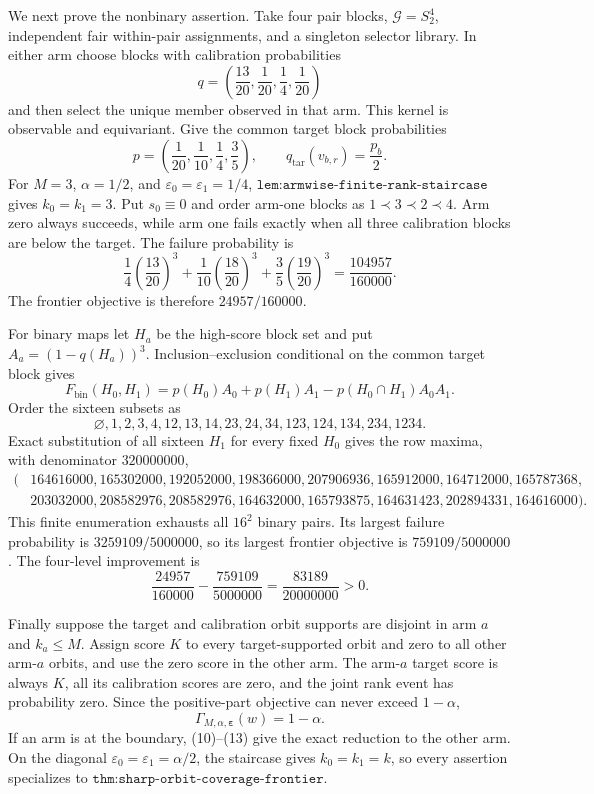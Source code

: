 We next prove the nonbinary assertion.  Take four pair blocks, \(\mathcal G=S_2^4\), independent fair within-pair assignments, and a singleton selector library.  In either arm choose blocks with calibration probabilities
\[
q=\left(\frac{13}{20},\frac1{20},\frac14,\frac1{20}\right)
\]
and then select the unique member observed in that arm.  This kernel is observable and equivariant.  Give the common target block probabilities
\[
p=\left(\frac1{20},\frac1{10},\frac14,\frac35\right),\qquad
q_{\mathrm{tar}}(v_{b,r})=\frac{p_b}{2}. \tag{15}
\]
For \(M=3\), \(\alpha=1/2\), and \(\varepsilon_0=\varepsilon_1=1/4\), \(\texttt{lem:armwise-finite-rank-staircase}\) gives \(k_0=k_1=3\).  Put \(s_0\equiv0\) and order arm-one blocks as \(1\prec3\prec2\prec4\).  Arm zero always succeeds, while arm one fails exactly when all three calibration blocks are below the target.  The failure probability is
\[
\frac14\left(\frac{13}{20}\right)^3+
\frac1{10}\left(\frac{18}{20}\right)^3+
\frac35\left(\frac{19}{20}\right)^3
=\frac{104957}{160000}. \tag{16}
\]
The frontier objective is therefore \(24957/160000\).

For binary maps let \(H_a\) be the high-score block set and put \(A_a=(1-q(H_a))^3\).  Inclusion--exclusion conditional on the common target block gives
\[
F_{\mathrm{bin}}(H_0,H_1)
=p(H_0)A_0+p(H_1)A_1-p(H_0\cap H_1)A_0A_1. \tag{17}
\]
Order the sixteen subsets as
\[
\varnothing,1,2,3,4,12,13,14,23,24,34,123,124,134,234,1234.
\]
Exact substitution of all sixteen \(H_1\) for every fixed \(H_0\) gives the row maxima, with denominator \(320000000\),
\[
\begin{split}
(&164616000,165302000,192052000,198366000,207906936,165912000,164712000,165787368,\\
&203032000,208582976,208582976,164632000,165793875,164631423,202894331,164616000).
\end{split} \tag{18}
\]
This finite enumeration exhausts all \(16^2\) binary pairs.  Its largest failure probability is \(3259109/5000000\), so its largest frontier objective is \(759109/5000000\).  The four-level improvement is
\[
\frac{24957}{160000}-\frac{759109}{5000000}
=\frac{83189}{20000000}>0. \tag{19}
\]

Finally suppose the target and calibration orbit supports are disjoint in arm \(a\) and \(k_a\le M\).  Assign score \(K\) to every target-supported orbit and zero to all other arm-\(a\) orbits, and use the zero score in the other arm.  The arm-\(a\) target score is always \(K\), all its calibration scores are zero, and the joint rank event has probability zero.  Since the positive-part objective can never exceed \(1-\alpha\),
\[
\Gamma_{M,\alpha,\boldsymbol\varepsilon}(w)=1-\alpha. \tag{20}
\]
If an arm is at the boundary, (10)--(13) give the exact reduction to the other arm.  On the diagonal \(\varepsilon_0=\varepsilon_1=\alpha/2\), the staircase gives \(k_0=k_1=k\), so every assertion specializes to \(\texttt{thm:sharp-orbit-coverage-frontier}\).